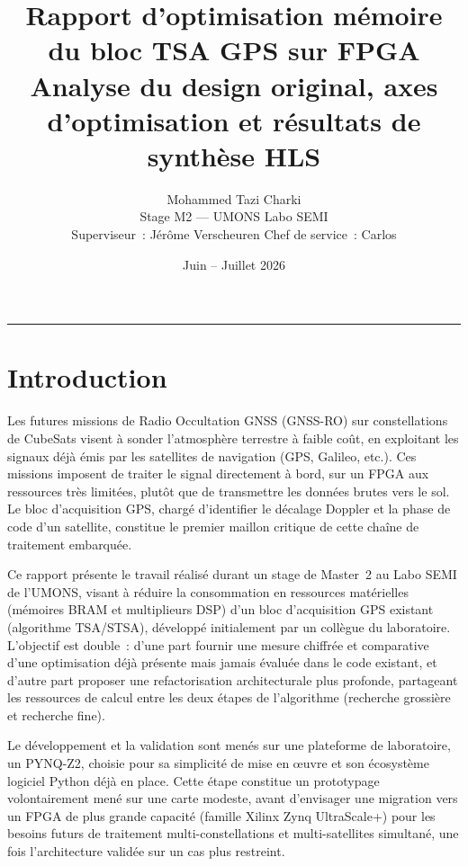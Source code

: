\documentclass[11pt,a4paper]{article}
\title{
  \vspace{-1.5cm}
  \Large\textbf{Rapport d'optimisation mémoire du bloc TSA GPS sur FPGA}\\[0.4em]
  \large Analyse du design original, axes d'optimisation et résultats de synthèse HLS
}
\author{Mohammed Tazi Charki\\
\small Stage M2 --- UMONS Labo SEMI\\
\small Superviseur~: Jérôme Verscheuren \quad Chef de service~: Carlos}
\date{Juin -- Juillet 2026}
\begin{document}
\maketitle
\thispagestyle{fancy}
\tableofcontents
\vspace{0.5cm}
\hrule
\vspace{0.5cm}

\section{Introduction}
\label{sec:intro}

Les futures missions de Radio Occultation GNSS (GNSS-RO) sur constellations de CubeSats visent à sonder l'atmosphère terrestre à faible coût, en exploitant les signaux déjà émis par les satellites de navigation (GPS, Galileo, etc.). Ces missions imposent de traiter le signal directement à bord, sur un FPGA aux ressources très limitées, plutôt que de transmettre les données brutes vers le sol. Le bloc d'acquisition GPS, chargé d'identifier le décalage Doppler et la phase de code d'un satellite, constitue le premier maillon critique de cette chaîne de traitement embarquée.

Ce rapport présente le travail réalisé durant un stage de Master~2 au Labo SEMI de l'UMONS, visant à réduire la consommation en ressources matérielles (mémoires BRAM et multiplieurs DSP) d'un bloc d'acquisition GPS existant (algorithme TSA/STSA), développé initialement par un collègue du laboratoire. L'objectif est double~: d'une part fournir une mesure chiffrée et comparative d'une optimisation déjà présente mais jamais évaluée dans le code existant, et d'autre part proposer une refactorisation architecturale plus profonde, partageant les ressources de calcul entre les deux étapes de l'algorithme (recherche grossière et recherche fine).

Le développement et la validation sont menés sur une plateforme de laboratoire, un PYNQ-Z2, choisie pour sa simplicité de mise en \oe{}uvre et son écosystème logiciel Python déjà en place. Cette étape constitue un prototypage volontairement mené sur une carte modeste, avant d'envisager une migration vers un FPGA de plus grande capacité (famille Xilinx Zynq UltraScale+) pour les besoins futurs de traitement multi-constellations et multi-satellites simultané, une fois l'architecture validée sur un cas plus restreint.
\end{document}
